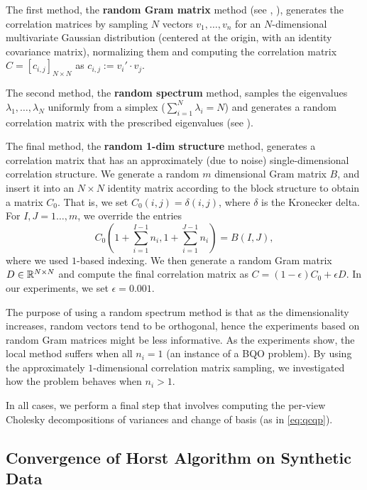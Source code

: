 The first method, the \textbf{random Gram matrix} method (see
\cite{Holmes:1991:RCM:105724.105730}, \cite{Bendel_Mickey_78}),
generates the correlation matrices by sampling $N$ vectors $v_1,
\ldots, v_n$ for an $N$-dimensional multivariate Gaussian
distribution (centered at the origin, with an identity covariance
matrix), normalizing them and computing the correlation matrix $C
= \left[c_{i,j}\right]_{N \times N}$ as $c_{i,j} := v_i' \cdot v_j$.
\begin{sloppypar}
The second method, the \textbf{random spectrum} method,
samples the eigenvalues $\lambda_1,\ldots,\lambda_N$ uniformly
from a simplex ($\sum_{i=1}^{N} \lambda_i = N$) and generates a
random correlation matrix with the prescribed eigenvalues (see
\cite{Bendel_Mickey_78}).
\end{sloppypar}
The final method, the \textbf{random 1-dim structure} method,
generates a correlation matrix that has an approximately (due to
noise) single-dimensional correlation structure. We
generate a random $m$ dimensional Gram matrix $B$, and insert
it into an $N\times N$ identity matrix according to the block
structure to obtain a matrix $C_0$. That is, we set $C_0\left(i,j\right) = \delta\left(i,j\right)$,
where $\delta$ is the Kronecker delta. For $I,J = 1\ldots,m$, we
override the entries $$C_0\left(1+ \sum_{i=1}^{I-1}n_i, 1+
\sum_{i=1}^{J-1}n_i\right) = B\left(I,J\right),$$ where we used $1$-based
indexing. We then generate a random Gram matrix $D \in
\mathbb{R}^{N\times N}$ and compute the final correlation matrix as $C
= \left(1- \epsilon\right)C_0 + \epsilon D$.
In our experiments, we set $\epsilon = 0.001$.

The purpose of using a random spectrum method
is that as the dimensionality increases, random vectors tend to
be orthogonal, hence the experiments based on random Gram
matrices might be less informative. As the experiments show, the
local method suffers  when all $n_i = 1$ (an instance of a BQO problem).
By using the approximately $1$-dimensional correlation matrix sampling,
we investigated how the problem behaves when $n_i > 1$.

In all cases, we perform a final step that involves computing the
per-view Cholesky decompositions of variances and change of basis
(as in \ref{eq:qcqp}).

\subsection{Convergence of Horst Algorithm on Synthetic Data}\label{chap:experiments:horst}

